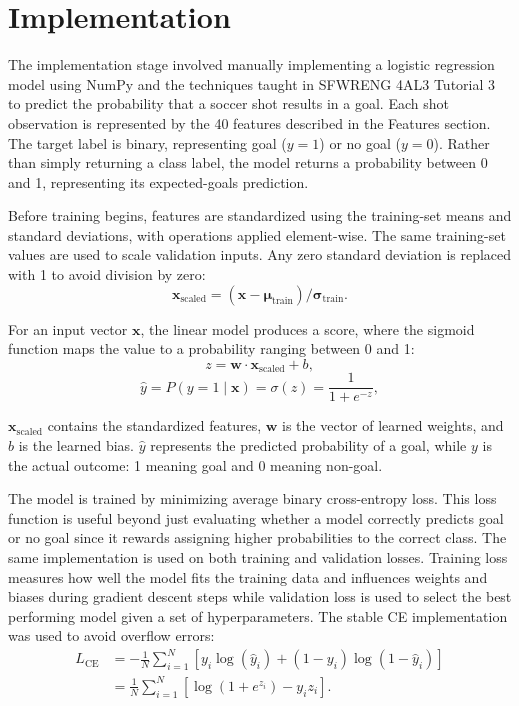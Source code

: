 \documentclass[11pt]{article}
\begin{document}
\section{Implementation}


The implementation stage involved manually implementing a logistic regression model using NumPy and the techniques taught in SFWRENG 4AL3 Tutorial 3 to predict the probability that a soccer shot results in a goal. Each shot observation is represented by the 40 features described in the Features section. The target label is binary, representing goal (\(y=1\)) or no goal (\(y=0\)). Rather than simply returning a class label, the model returns a probability between 0 and 1, representing its expected-goals prediction.

Before training begins, features are standardized using the training-set means and standard deviations, with operations applied element-wise. The same training-set values are used to scale validation inputs. Any zero standard deviation is replaced with 1 to avoid division by zero:
\[
\mathbf{x}_{\mathrm{scaled}} = (\mathbf{x} - \boldsymbol{\mu}_{\mathrm{train}})/\boldsymbol{\sigma}_{\mathrm{train}}.
\]

For an input vector \(\mathbf{x}\), the linear model produces a score, where the sigmoid function maps the value to a probability ranging between 0 and 1:
\[
z = \mathbf{w} \cdot \mathbf{x}_{\mathrm{scaled}} + b,
\]
\[
\hat{y}=P(y=1\mid\mathbf{x})=\sigma(z)=\frac{1}{1+e^{-z}},
\]

\(\mathbf{x}_{\mathrm{scaled}}\) contains the standardized features, \(\mathbf{w}\) is the vector of learned weights, and \(b\) is the learned bias. \(\hat{y}\) represents the predicted probability of a goal, while \(y\) is the actual outcome: 1 meaning goal and 0 meaning non-goal.

The model is trained by minimizing average binary cross-entropy loss. This loss function is useful beyond just evaluating whether a model correctly predicts goal or no goal since it rewards assigning higher probabilities to the correct class. The same implementation is used on both training and validation losses. Training loss measures how well the model fits the training data and influences weights and biases during gradient descent steps while validation loss is used to select the best performing model given a set of hyperparameters. The stable CE implementation was used to avoid overflow errors:
\[
\begin{aligned}
L_{\mathrm{CE}}
&= -\frac{1}{N}\sum_{i=1}^{N}
\left[y_i\log(\hat{y}_i)+(1-y_i)\log(1-\hat{y}_i)\right] \\
&= \frac{1}{N}\sum_{i=1}^{N}
\left[\log(1+e^{z_i})-y_i z_i\right].
\end{aligned}
\]
\end{document}
